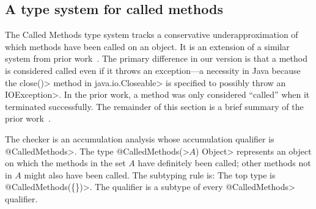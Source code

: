 

\subsection{A type system for called methods}
\label{sec:called-methods}


The Called Methods type system tracks a conservative underapproximation of which methods have been called on an object.
It is an extension of a similar system
from prior work~\cite{KelloggRSSE2020}.  The primary difference in our
version is that a method is considered called even if it throws an
exception---a necessity in Java because the \<close()> method
in \<java.io.Closeable> is specified to possibly throw an \<IOException>.
In the prior work, a method was only considered ``called'' when it terminated
successfully.
The remainder of this section is a brief summary
of the prior work~\cite{KelloggRSSE2020}.


The checker is an accumulation analysis whose accumulation qualifier is \<@CalledMethods>.
The type \<@CalledMethods(>$A$\<) Object>
represents an object on which the methods in the set $A$ have definitely
been called; other methods not in $A$ might also have been called.
The subtyping
rule is:
The top type is \<@CalledMethods(\{\})>.
The qualifier \CalledMethodsBottom is a subtype of every \<@CalledMethods> qualifier.

